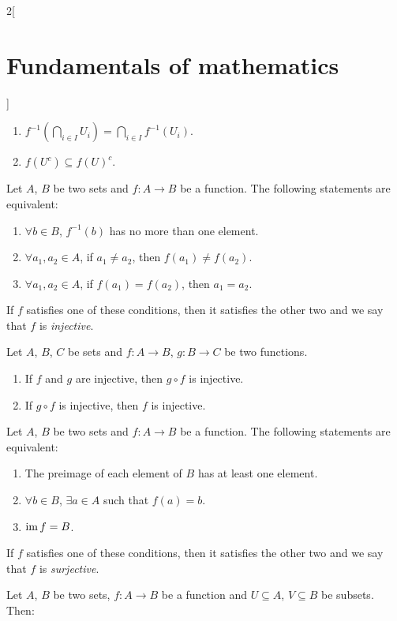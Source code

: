 \documentclass[../../../main.tex]{subfiles}
\begin{document}
\begin{multicols}{2}[\section{Fundamentals of mathematics}]
\begin{prop}
\begin{enumerate}
      \item $f^{-1}\left(\bigcap_{i\in I}U_i\right)=\bigcap_{i\in I}f^{-1}(U_i)$.
      \item $f(U^c)\subseteq f(U)^c$.
    \end{enumerate}
  \end{prop}
  \begin{definition}
    Let $A$, $B$ be two sets and $f:A\rightarrow B$ be a function. The following statements are equivalent:
    \begin{enumerate}
      \item $\forall b\in B$, $f^{-1}(b)$ has no more than one element.
      \item $\forall a_1,a_2\in A$, if $a_1\ne a_2$, then $f(a_1)\ne f(a_2)$.
      \item $\forall a_1,a_2\in A$, if $f(a_1)= f(a_2)$, then $a_1=a_2$.
    \end{enumerate}
    If $f$ satisfies one of these conditions, then it satisfies the other two and we say that $f$ is \emph{injective}.
  \end{definition}
  \begin{prop}
    Let $A$, $B$, $C$ be sets and $f:A\rightarrow B$, $g:B\rightarrow C$ be two functions.
    \begin{enumerate}
      \item If $f$ and $g$ are injective, then $g\circ f$ is injective.
      \item If $g\circ f$ is injective, then $f$ is injective.
    \end{enumerate}
  \end{prop}
  \begin{definition}
    Let $A$, $B$ be two sets and $f:A\rightarrow B$ be a function. The following statements are equivalent:
    \begin{enumerate}
      \item The preimage of each element of $B$ has at least one element.
      \item $\forall b\in B$, $\exists a\in A$ such that $f(a)=b$.
      \item $\operatorname{im} f=B$.
    \end{enumerate}
    If $f$ satisfies one of these conditions, then it satisfies the other two and we say that $f$ is \emph{surjective}.
  \end{definition}
  \begin{prop}
    Let $A$, $B$ be two sets, $f:A\rightarrow B$ be a function and $U\subseteq A$, $V\subseteq B$ be subsets. Then:
    \begin{enumerate}

\end{enumerate}
\end{prop}
\end{multicols}
\end{document}
